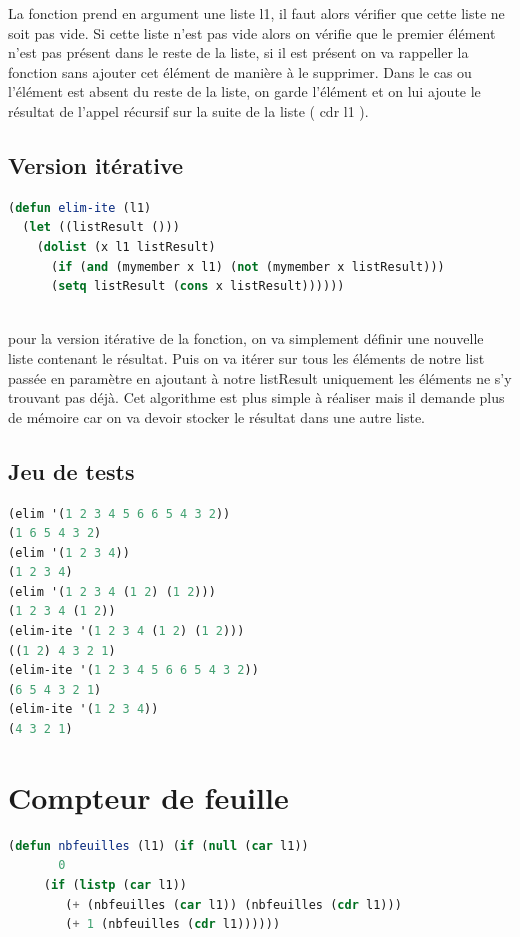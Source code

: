 \documentclass[a4paper,10pt]{report}
\begin{document}
      La fonction prend en argument une liste l1, il faut alors vérifier que cette liste ne soit pas vide. Si cette liste n'est pas vide alors on vérifie que le premier élément
      n'est pas présent dans le reste de la liste, si il est présent on va rappeller la fonction sans ajouter cet élément de manière à le supprimer. Dans le cas ou l'élément
      est absent du reste de la liste, on garde l'élément et on lui ajoute le résultat de l'appel récursif sur la suite de la liste ( cdr l1 ).
      

      \subsection{Version itérative}
	\begin{lstlisting}[language=Lisp]
(defun elim-ite (l1)
  (let ((listResult ()))
    (dolist (x l1 listResult)
      (if (and (mymember x l1) (not (mymember x listResult)))
	  (setq listResult (cons x listResult))))))
	
	\end{lstlisting}

	pour la version itérative de la fonction, on va simplement définir une nouvelle liste contenant le résultat. Puis on va itérer sur tous les éléments de notre list passée en 
	paramètre en ajoutant à notre listResult uniquement les éléments ne s'y trouvant pas déjà.\newline
	Cet algorithme est plus simple à réaliser mais il demande plus de mémoire car on va devoir stocker le résultat dans une autre liste.
	   \subsection{Jeu de tests}
	  \begin{lstlisting}[language=Lisp]
(elim '(1 2 3 4 5 6 6 5 4 3 2))
(1 6 5 4 3 2)
(elim '(1 2 3 4))
(1 2 3 4)
(elim '(1 2 3 4 (1 2) (1 2)))
(1 2 3 4 (1 2))
(elim-ite '(1 2 3 4 (1 2) (1 2)))
((1 2) 4 3 2 1)
(elim-ite '(1 2 3 4 5 6 6 5 4 3 2))
(6 5 4 3 2 1)
(elim-ite '(1 2 3 4))
(4 3 2 1)

		 \end{lstlisting}
		 \newpage
	\section{Compteur de feuille}
	
	   \begin{lstlisting}[language=Lisp]
(defun nbfeuilles (l1) (if (null (car l1))
	   0
	 (if (listp (car l1)) 
	    (+ (nbfeuilles (car l1)) (nbfeuilles (cdr l1))) 
	    (+ 1 (nbfeuilles (cdr l1))))))
	  \end{lstlisting}
\end{document}

